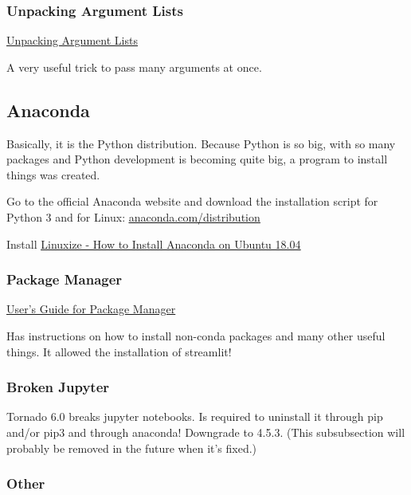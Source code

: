 \subsubsection{Unpacking Argument Lists}

\href{https://docs.python.org/3.7/tutorial/controlflow.html#unpacking-argument-lists}{\ul{Unpacking Argument Lists}}

A very useful trick to pass many arguments at once.




\subsection{Anaconda}
Basically, it is the Python distribution. Because Python is so big, with so many packages and Python development is becoming quite big, a program to install things was created.

Go to the official Anaconda website and download the installation script for Python 3 and for Linux: \href{https://www.anaconda.com/distribution/}{\ul{anaconda.com/distribution}}


Install \href{https://linuxize.com/post/how-to-install-anaconda-on-ubuntu-18-04/}{\ul{Linuxize - How to Install Anaconda on Ubuntu 18.04}}

\subsubsection{Package Manager}
\href{https://docs.conda.io/projects/conda/en/latest/user-guide/tasks/manage-pkgs.html}{\ul{User's Guide for Package Manager}}

Has instructions on how to install non-conda packages and many other useful things. It allowed the installation of streamlit!

\subsubsection{Broken Jupyter}

Tornado 6.0 breaks jupyter notebooks. Is required to uninstall it through pip and/or pip3 and through anaconda! Downgrade to 4.5.3. (This subsubsection will probably be removed in the future when it's fixed.)



\subsubsection{Other}

